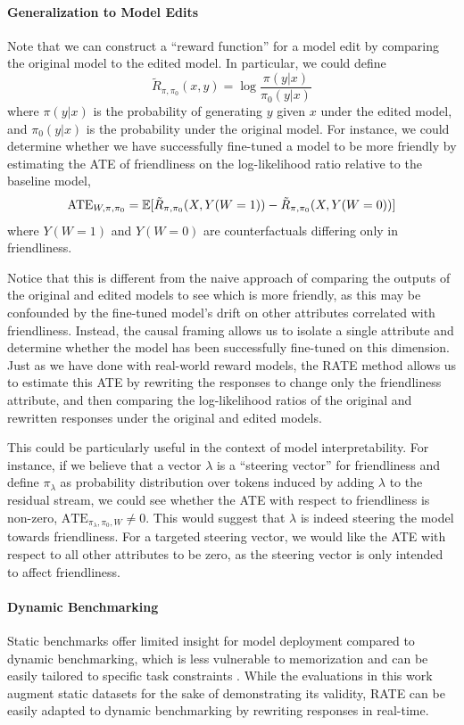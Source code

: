 \documentclass{article}
\begin{document}
\paragraph{Generalization to Model Edits}
Note that we can construct a ``reward function'' for a model edit by comparing the original model to the edited model.  In particular, we could define
\[\tilde{R}_{\pi, \pi_0}(x, y) = \log\frac{\pi(y|x)}{\pi_0(y|x)}\]
where $\pi(y|x)$ is the probability of generating $y$ given $x$ under the edited model, and $\pi_0(y|x)$ is the probability under the original model. For instance, we could determine whether we have successfully fine-tuned a model to be more friendly by estimating the ATE of friendliness on the log-likelihood ratio relative to the baseline model, \[\text{ATE}_{W, \pi, \pi_0} = \mathbb{E}[\tilde{R}_{\pi, \pi_0}(X, Y(W=1)) - \tilde{R}_{\pi, \pi_0}(X, Y(W=0))]\] where $Y(W=1)$ and $Y(W=0)$ are counterfactuals differing only in friendliness. 

Notice that this is different from the naive approach of comparing the outputs of the original and edited models to see which is more friendly, as this may be confounded by the fine-tuned model's drift on other attributes correlated with friendliness. Instead, the causal framing allows us to isolate a single attribute and determine whether the model has been successfully fine-tuned on this dimension. Just as we have done with real-world reward models, the RATE method allows us to estimate this ATE by rewriting the responses to change only the friendliness attribute, and then comparing the log-likelihood ratios of the original and rewritten responses under the original and edited models.

This could be particularly useful in the context of model interpretability. For instance, if we believe that a vector $\lambda$ is a ``steering vector'' for friendliness and define $\pi_\lambda$ as probability distribution over tokens induced by adding $\lambda$ to the residual stream, we could see whether the ATE with respect to friendliness is non-zero, $\text{ATE}_{\pi_\lambda, \pi_0, W} \neq 0$. This would suggest that $\lambda$ is indeed steering the model towards friendliness. For a targeted steering vector, we would like the ATE with respect to all other attributes to be zero, as the steering vector is only intended to affect friendliness.

\paragraph{Dynamic Benchmarking} Static benchmarks offer limited insight for model deployment compared to dynamic benchmarking, which is less vulnerable to memorization and can be easily tailored to specific task constraints \citep{saxon2024benchmarksmicroscopesmodelmetrology}. While the evaluations in this work augment static datasets for the sake of demonstrating its validity, RATE can be easily adapted to dynamic benchmarking by rewriting responses in real-time.
\end{document}
